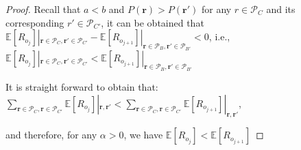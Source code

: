 \documentclass[11pt, oneside]{article}   	%
\begin{document}
\begin{proof}
Recall that $a<b$ and $P(\bm{r}) > P(\bm{r'})$ for any $r \in \mathcal{P}_C$ and its corresponding $r' \in \mathcal{P}_{C'}$, it can be obtained that \\

$\mathbb{E}[R_{o_j}]|_{\bm{r}\in \mathcal{P}_C,\bm{r'}\in \mathcal{P}_{C'}} - \mathbb{E}[R_{o_{j+1}}]|_{\bm{r}\in \mathcal{P}_B,\bm{r'}\in \mathcal{P}_{B'}} < 0$, i.e., $\mathbb{E}[R_{o_j}]|_{\bm{r}\in \mathcal{P}_C,\bm{r'}\in \mathcal{P}_{C'}} < \mathbb{E}[R_{o_{j+1}}]|_{\bm{r}\in \mathcal{P}_B,\bm{r'}\in \mathcal{P}_{B'}}$

It is straight forward to obtain that:\\
 $\sum\limits_{\bm{r}\in \mathcal{P}_C, \bm{r}\in \mathcal{P}_{C'}}\mathbb{E}[R_{o_j}] |_{\bm{r}, \bm{r'}} < \sum\limits_{\bm{r}\in \mathcal{P}_C, \bm{r}\in \mathcal{P}_{C'}}\mathbb{E}[R_{o_{j+1}}] |_{\bm{r}, \bm{r'}}$,
 
and therefore, 
for any $\alpha > 0$, we have $\mathbb{E}[R_{o_j}] < \mathbb{E}[R_{o_{j+1}}]$

\end{proof}
\end{document}
